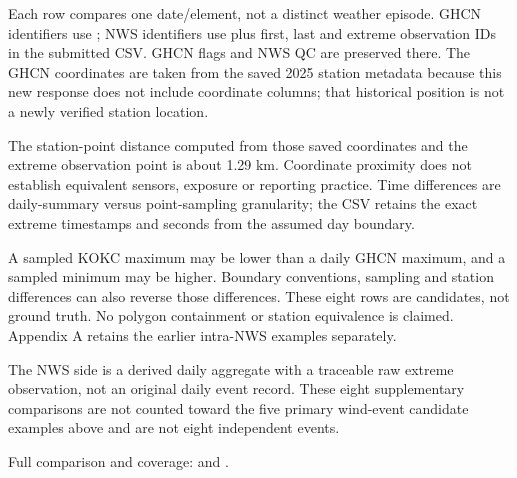 Each row compares one date/element, not a distinct weather episode. GHCN identifiers use ; NWS identifiers use  plus first, last and extreme observation IDs in the submitted CSV. GHCN flags and NWS QC are preserved there. The GHCN coordinates are taken from the saved 2025 station metadata because this new response does not include coordinate columns; that historical position is not a newly verified station location.

The station-point distance computed from those saved coordinates and the extreme observation point is about 1.29 km. Coordinate proximity does not establish equivalent sensors, exposure or reporting practice. Time differences are daily-summary versus point-sampling granularity; the CSV retains the exact extreme timestamps and seconds from the assumed day boundary.

A sampled KOKC maximum may be lower than a daily GHCN maximum, and a sampled minimum may be higher. Boundary conventions, sampling and station differences can also reverse those differences. These eight rows are candidates, not ground truth. No polygon containment or station equivalence is claimed. Appendix A retains the earlier intra-NWS examples separately.

The NWS side is a derived daily aggregate with a traceable raw extreme observation, not an original daily event record. These eight supplementary comparisons are not counted toward the five primary wind-event candidate examples above and are not eight independent events.

Full comparison and coverage:  and .
